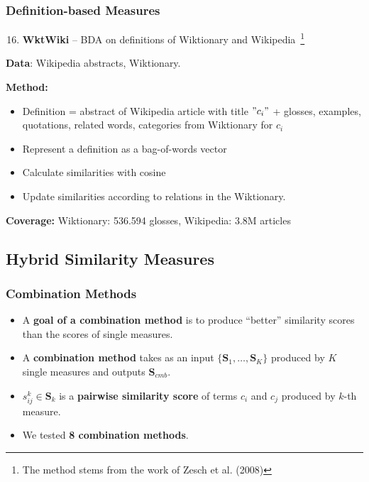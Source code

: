 \documentclass{beamer}
\begin{document}
\begin{frame}
\frametitle{Definition-based Measures}

\begin{enumerate}
 \setcounter{enumi}{15} 
\item \textbf{WktWiki} -- BDA on definitions of Wiktionary and Wikipedia~\footnote{The method stems from the work of Zesch et al. (2008)}

\end{enumerate}

\textbf{Data}: Wikipedia abstracts, Wiktionary.

\textbf{Method:}
\begin{itemize}
  \item Definition = abstract of Wikipedia article with title $"c_i"$ + 
   glosses, examples, quotations, related words, categories from Wiktionary  for $c_i$
   \item Represent a definition as a bag-of-words vector
   \item Calculate similarities with cosine
   \item Update similarities according to relations in the Wiktionary.
  
\end{itemize}
   \textbf{Coverage:} Wiktionary: 536.594 glosses, Wikipedia: 3.8M articles
   
\end{frame}


\subsection{Hybrid Similarity Measures}

\begin{frame}
\frametitle{Combination Methods}
\begin{itemize}
\item A \textbf{goal of a combination method} is to produce ``better'' similarity scores than the
scores of single measures.

\item A \textbf{combination method} takes as an input   
$\{\mathbf{S}_1,\ldots,\mathbf{S}_K\}$ produced by $K$ single measures and
outputs  $\mathbf{S}_{cmb}$.

\item $s_{ij}^k \in \mathbf{S}_k$ is a \textbf{pairwise similarity score} of terms $c_i$ and $c_j$ produced by $k$-th measure.

\item We tested \textbf{8  combination methods}.

\end{itemize}
\end{frame}
\end{document}
